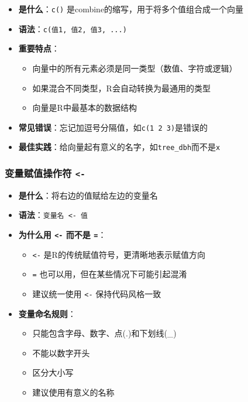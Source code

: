 \documentclass[
]{book}
\providecommand{\tightlist}{%
  \setlength{\itemsep}{0pt}\setlength{\parskip}{0pt}}
\begin{document}
\begin{itemize}
\tightlist
\item
  \textbf{是什么}：\texttt{c()} 是combine的缩写，用于将多个值组合成一个向量
\item
  \textbf{语法}：\texttt{c(值1,\ 值2,\ 值3,\ ...)}
\item
  \textbf{重要特点}：

  \begin{itemize}
  \tightlist
  \item
    向量中的所有元素必须是同一类型（数值、字符或逻辑）
  \item
    如果混合不同类型，R会自动转换为最通用的类型
  \item
    向量是R中最基本的数据结构
  \end{itemize}
\item
  \textbf{常见错误}：忘记加逗号分隔值，如\texttt{c(1\ 2\ 3)}是错误的
\item
  \textbf{最佳实践}：给向量起有意义的名字，如\texttt{tree\_dbh}而不是\texttt{x}
\end{itemize}

\hypertarget{ux53d8ux91cfux8d4bux503cux64cdux4f5cux7b26--}{%
\subsubsection{\texorpdfstring{变量赋值操作符 \texttt{\textless{}-}}{变量赋值操作符 \textless-}}\label{ux53d8ux91cfux8d4bux503cux64cdux4f5cux7b26--}}

\begin{itemize}
\tightlist
\item
  \textbf{是什么}：将右边的值赋给左边的变量名
\item
  \textbf{语法}：\texttt{变量名\ \textless{}-\ 值}
\item
  \textbf{为什么用 \texttt{\textless{}-} 而不是 \texttt{=}}：

  \begin{itemize}
  \tightlist
  \item
    \texttt{\textless{}-} 是R的传统赋值符号，更清晰地表示赋值方向
  \item
    \texttt{=} 也可以用，但在某些情况下可能引起混淆
  \item
    建议统一使用 \texttt{\textless{}-} 保持代码风格一致
  \end{itemize}
\item
  \textbf{变量命名规则}：

  \begin{itemize}
  \tightlist
  \item
    只能包含字母、数字、点(.)和下划线(\_)
  \item
    不能以数字开头
  \item
    区分大小写
  \item
    建议使用有意义的名称
  \end{itemize}
\end{itemize}
\end{document}
